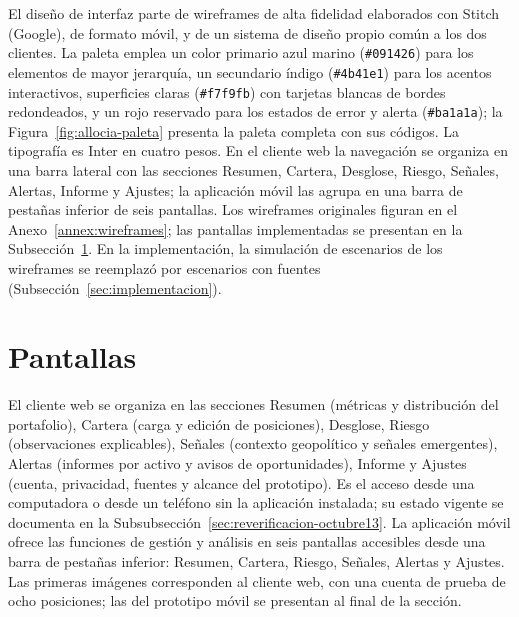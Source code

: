 El diseño de interfaz parte de wireframes de alta fidelidad elaborados con Stitch (Google), de formato móvil, y de un sistema de diseño propio común a los dos clientes. La paleta emplea un color primario azul marino (\texttt{\#091426}) para los elementos de mayor jerarquía, un secundario índigo (\texttt{\#4b41e1}) para los acentos interactivos, superficies claras (\texttt{\#f7f9fb}) con tarjetas blancas de bordes redondeados, y un rojo reservado para los estados de error y alerta (\texttt{\#ba1a1a}); la Figura~\ref{fig:allocia-paleta} presenta la paleta completa con sus códigos. La tipografía es Inter en cuatro pesos. En el cliente web la navegación se organiza en una barra lateral con las secciones Resumen, Cartera, Desglose, Riesgo, Señales, Alertas, Informe y Ajustes; la aplicación móvil las agrupa en una barra de pestañas inferior de seis pantallas. Los wireframes originales figuran en el Anexo~\ref{annex:wireframes}; las pantallas implementadas se presentan en la Subsección~\ref{sec:pantallas}. En la implementación, la simulación de escenarios de los wireframes se reemplazó por escenarios con fuentes (Subsección~\ref{sec:implementacion}).



\section{Pantallas}\label{sec:pantallas}

El cliente web se organiza en las secciones Resumen (métricas y distribución del portafolio), Cartera (carga y edición de posiciones), Desglose, Riesgo (observaciones explicables), Señales (contexto geopolítico y señales emergentes), Alertas (informes por activo y avisos de oportunidades), Informe y Ajustes (cuenta, privacidad, fuentes y alcance del prototipo). Es el acceso desde una computadora o desde un teléfono sin la aplicación instalada; su estado vigente se documenta en la Subsubsección~\ref{sec:reverificacion-octubre13}. La aplicación móvil ofrece las funciones de gestión y análisis en seis pantallas accesibles desde una barra de pestañas inferior: Resumen, Cartera, Riesgo, Señales, Alertas y Ajustes. Las primeras imágenes corresponden al cliente web, con una cuenta de prueba de ocho posiciones; las del prototipo móvil se presentan al final de la sección.

